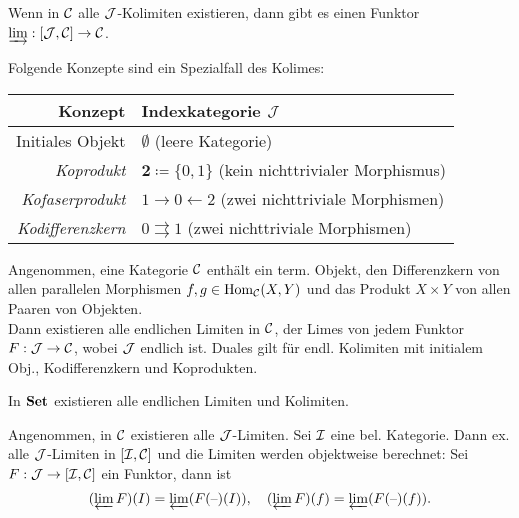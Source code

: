 \documentclass{cheat-sheet}
\begin{document}
\begin{bem}
  Wenn in $\mathcal{C}$ alle $\mathcal{J}$-Kolimiten existieren, dann gibt es einen Funktor $\varinjlim : [\mathcal{J}, \mathcal{C}] \to \mathcal{C}$.
\end{bem}

\begin{bem}
  Folgende Konzepte sind ein Spezialfall des Kolimes:
  \begin{center}
    \begin{tabular}{ | r | l | }
      \hline
      Konzept & Indexkategorie $\mathcal{J}$ \\ \hline
      Initiales Objekt & $\emptyset$ (leere Kategorie) \\
      \emph{Koprodukt} & $\mathbf{2} \coloneqq \{ 0, 1 \}$ (kein nichttrivialer Morphismus) \\
      \emph{Kofaserprodukt} & $1 \to 0 \leftarrow 2$ (zwei nichttriviale Morphismen) \\
      \emph{Kodifferenzkern} &  $0 \rightrightarrows 1$ (zwei nichttriviale Morphismen) \\ \hline
    \end{tabular}
  \end{center}
\end{bem}

\begin{satz}
  Angenommen, eine Kategorie $\mathcal{C}$ enthält ein term. Objekt, den Differenzkern von allen parallelen Morphismen $f, g \in \operatorname{Hom}_{\mathcal{C}}(X, Y)$ und das Produkt $X \times Y$ von allen Paaren von Objekten. \\
  Dann existieren alle endlichen Limiten in $\mathcal{C}$, \dh{} der Limes von jedem Funktor $F : \mathcal{J} \to \mathcal{C}$, wobei $\mathcal{J}$ endlich ist.
  Duales gilt für endl. Kolimiten mit initialem Obj., Kodifferenzkern und Koprodukten.
\end{satz}

\begin{kor}
  In $\mathbf{Set}$ existieren alle endlichen Limiten und Kolimiten.
\end{kor}

\begin{bem}
  Angenommen, in $\mathcal{C}$ existieren alle $\mathcal{J}$-Limiten.
  Sei $\mathcal{I}$ eine bel. Kategorie.
  Dann ex. alle $\mathcal{J}$-Limiten in $[\mathcal{I}, \mathcal{C}]$ und die Limiten werden objektweise berechnet:
  Sei $F : \mathcal{J} \to [\mathcal{I}, \mathcal{C}]$ ein Funktor, dann ist
  \[
    (\varprojlim F)(I) = \varprojlim (F(\text{--})(I)), \quad
    (\varprojlim F)(f) = \varprojlim (F(\text{--})(f)).
  \]
\end{bem}
\end{document}
